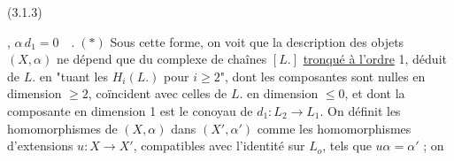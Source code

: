 (3.1.3) \qquad , \quad $\alpha\, d_1 = 0 \quad . \;(*)$
Sous cette forme, on voit que la description des objets $(X,\alpha)$ ne dépend que du complexe de chaînes $[L.]$ \underline{tronqué à l'ordre} 1, déduit de $L.$ en "tuant les $H_i(L.)$ pour $i \geq 2$", dont les composantes sont nulles en dimension $\geq 2$, coïncident avec celles de $L.$ en dimension $\leq 0$, et dont la composante en dimension 1 est le conoyau de $d_1: L_2 \longrightarrow L_1$. On définit les homomorphismes de $(X,\alpha)$ dans $(X',\alpha')$ comme les homomorphismes d'extensions $u: X \longrightarrow X'$, compatibles avec l'identité sur $L_o$, tels que $u \alpha = \alpha'$ ; on 

